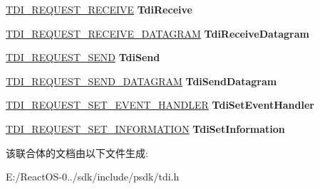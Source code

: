 \begin{DoxyCompactItemize}
\item 
\mbox{\label{union___t_d_i___r_e_q_u_e_s_t___t_y_p_e_acc943c6f0a019bbaaa83dbb435fd6ce2}} 
\hyperlink{struct___t_d_i___r_e_q_u_e_s_t___r_e_c_e_i_v_e}{T\+D\+I\+\_\+\+R\+E\+Q\+U\+E\+S\+T\+\_\+\+R\+E\+C\+E\+I\+VE} {\bfseries Tdi\+Receive}
\item 
\mbox{\label{union___t_d_i___r_e_q_u_e_s_t___t_y_p_e_abc1a4e767ea303683897185486f7b010}} 
\hyperlink{struct___t_d_i___r_e_q_u_e_s_t___r_e_c_e_i_v_e___d_a_t_a_g_r_a_m}{T\+D\+I\+\_\+\+R\+E\+Q\+U\+E\+S\+T\+\_\+\+R\+E\+C\+E\+I\+V\+E\+\_\+\+D\+A\+T\+A\+G\+R\+AM} {\bfseries Tdi\+Receive\+Datagram}
\item 
\mbox{\label{union___t_d_i___r_e_q_u_e_s_t___t_y_p_e_a5d09577f3d9f21797dc0cce090a51c70}} 
\hyperlink{struct___t_d_i___r_e_q_u_e_s_t___s_e_n_d}{T\+D\+I\+\_\+\+R\+E\+Q\+U\+E\+S\+T\+\_\+\+S\+E\+ND} {\bfseries Tdi\+Send}
\item 
\mbox{\label{union___t_d_i___r_e_q_u_e_s_t___t_y_p_e_a3a202a6690ce4ca80b78600ac4437884}} 
\hyperlink{struct___t_d_i___r_e_q_u_e_s_t___s_e_n_d___d_a_t_a_g_r_a_m}{T\+D\+I\+\_\+\+R\+E\+Q\+U\+E\+S\+T\+\_\+\+S\+E\+N\+D\+\_\+\+D\+A\+T\+A\+G\+R\+AM} {\bfseries Tdi\+Send\+Datagram}
\item 
\mbox{\label{union___t_d_i___r_e_q_u_e_s_t___t_y_p_e_a85750940ba93ff7c23809df97bbd57e7}} 
\hyperlink{struct___t_d_i___r_e_q_u_e_s_t___s_e_t___e_v_e_n_t}{T\+D\+I\+\_\+\+R\+E\+Q\+U\+E\+S\+T\+\_\+\+S\+E\+T\+\_\+\+E\+V\+E\+N\+T\+\_\+\+H\+A\+N\+D\+L\+ER} {\bfseries Tdi\+Set\+Event\+Handler}
\item 
\mbox{\label{union___t_d_i___r_e_q_u_e_s_t___t_y_p_e_ac3075236d26d394649a36e0e8c5eb7c7}} 
\hyperlink{struct___t_d_i___r_e_q_u_e_s_t___s_e_t___i_n_f_o_r_m_a_t_i_o_n}{T\+D\+I\+\_\+\+R\+E\+Q\+U\+E\+S\+T\+\_\+\+S\+E\+T\+\_\+\+I\+N\+F\+O\+R\+M\+A\+T\+I\+ON} {\bfseries Tdi\+Set\+Information}
\end{DoxyCompactItemize}


该联合体的文档由以下文件生成\+:\begin{DoxyCompactItemize}
\item 
E\+:/\+React\+O\+S-\/0../sdk/include/psdk/tdi.\+h\end{DoxyCompactItemize}
